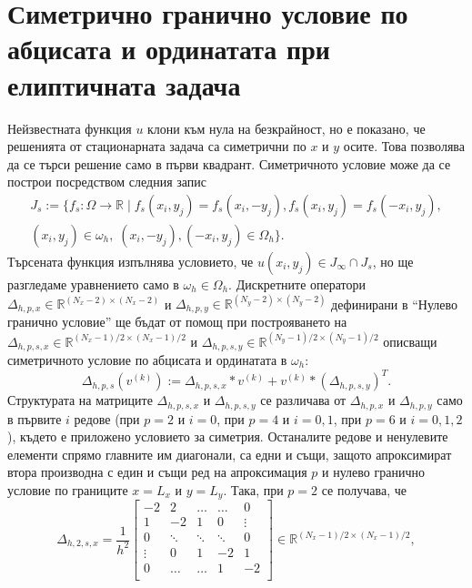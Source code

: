 \documentclass{article}
\newcommand{\be}{\begin{equation}}
\newcommand{\ee}{\end{equation}}
\newcommand{\RR}{\mathbb{R}}
\begin{document}
\section{Симетрично гранично условие по абцисата и ординатата при елиптичната задача}
Нейзвестната функция $u$ клони към нула на безкрайност, но е показано, че решенията от стационарната задача са симетрични по $x$ и $y$ осите. Това позволява да се търси решение само в първи квадрант. Симетричното условие може да се построи посредством следния запис
\begin{align}\label{funSpaceSym}
J_s:=\{ f_s : \Omega \rightarrow \RR  \; | \; f_s(x_i,y_j) = f_s(x_i,-y_j), f_s(x_i,y_j) = f_s(-x_i,y_j),\nonumber\\
(x_i,y_j) \in \omega_h, \; (x_i,-y_j), (-x_i,y_j) \in \Omega_h\}.
\end{align}
Търсената функция изпълнява условието, че $u(x_i,y_j) \in J_\infty \cap J_s$, но ще разгледаме уравнението само в $\omega_h \in \Omega_h$. Дискретните оператори $\Delta_{h,p,x} \in \RR^{(N_x-2) \times (N_x-2)}$ и $\Delta_{h,p,y} \in \RR^{(N_y-2)\times(N_y-2)}$ дефинирани в ``Нулево гранично условие''  ще бъдат от помощ при построяването на $\Delta_{h,p,s,x} \in \RR^{(N_x-1)/2 \times (N_x-1)/2}$ и $\Delta_{h,p,s,y} \in \RR^{(N_y-1)/2\times(N_y-1)/2}$ описващи симетричното условие по абцисата и ординатата в $\omega_h$:
\be\label{PsnDiscretSym}
\Delta_{h,p,s}(v^{(k)}) := \Delta_{h,p,s,x} *  v^{(k)} + v^{(k)} * (\Delta_{h,p,s,y})^T.
\ee
Структурата на матриците $\Delta_{h,p,s,x}$ и $\Delta_{h,p,s,y}$ се различава от $\Delta_{h,p,x}$ и $\Delta_{h,p,y}$ само в първите $i$ редове (при $p=2$ и $i=0$, при $p=4$ и $i=0,1$, при $p=6$ и $i=0,1,2$), където е приложено условието за симетрия. Останалите редове и ненулевите елементи спрямо главните им диагонали, са едни и същи, защото апроксимират втора производна с един и същи ред на апроксимация $p$ и нулево гранично условие по границите $x=L_x$ и $y=L_y$. Така, при $p=2$ се получава, че 
\[
\Delta_{h,2,s,x} = \frac{1}{h^2}
\begin{bmatrix}
    -2	       & 2        &     \dots   &   \dots        & 0   \\
    1               & -2            &   1           &   0               & \vdots    \\
        0           & \ddots        &    \ddots    &   \ddots       &  0 \\ 
    \vdots       &     0            &  1     	& -2    	   & 1 \\
    0               & \dots          &  \dots         & 1  	   & -2 \\
\end{bmatrix}
\in \RR^{(N_x-1)/2 \times (N_x-1)/2},
\]
\end{document}

